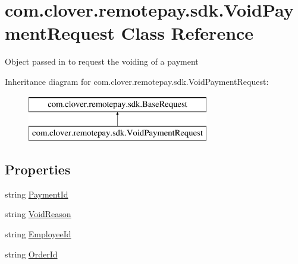 \hypertarget{classcom_1_1clover_1_1remotepay_1_1sdk_1_1_void_payment_request}{}\section{com.\+clover.\+remotepay.\+sdk.\+Void\+Payment\+Request Class Reference}
\label{classcom_1_1clover_1_1remotepay_1_1sdk_1_1_void_payment_request}


Object passed in to request the voiding of a payment  


Inheritance diagram for com.\+clover.\+remotepay.\+sdk.\+Void\+Payment\+Request\+:\begin{figure}[H]
\begin{center}
\leavevmode
\includegraphics[height=2.000000cm]{classcom_1_1clover_1_1remotepay_1_1sdk_1_1_void_payment_request}
\end{center}
\end{figure}
\subsection*{Properties}
\begin{DoxyCompactItemize}
\item 
string \hyperlink{classcom_1_1clover_1_1remotepay_1_1sdk_1_1_void_payment_request_ad6cabb80cc9a585efa4d36e5d187f7d0}{Payment\+Id}
\item 
string \hyperlink{classcom_1_1clover_1_1remotepay_1_1sdk_1_1_void_payment_request_a90b8ef7283baba36861dcd5ee115af6a}{Void\+Reason}
\item 
string \hyperlink{classcom_1_1clover_1_1remotepay_1_1sdk_1_1_void_payment_request_a3b64c5c2a8e63313e64a70869aa61820}{Employee\+Id}
\item 
string \hyperlink{classcom_1_1clover_1_1remotepay_1_1sdk_1_1_void_payment_request_adbffbb3a5cd23b3419d9e749036b6d4b}{Order\+Id}
\end{DoxyCompactItemize}
